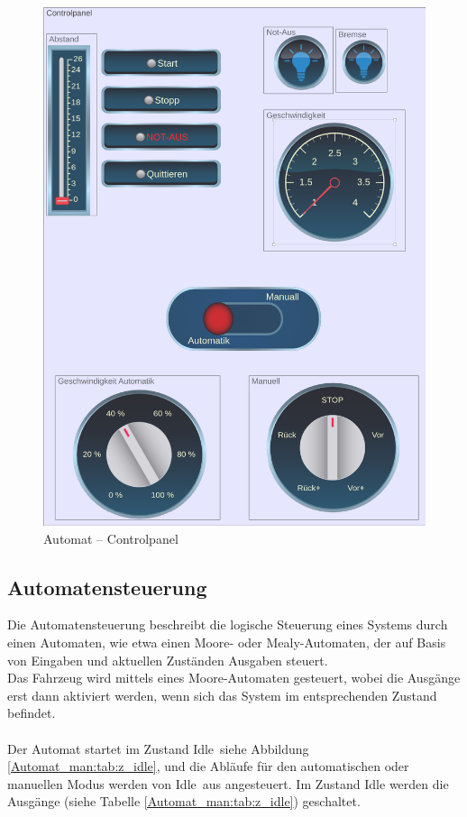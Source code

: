 \pagebreak[1]
\begin{figure}[!ht]
	\begin{center}
		\includegraphics[width=\textwidth]{img/5_simulation/Automat_con.png}
		\caption{Automat – Controlpanel}
		\label{Controlpanel:img:Controlpanel}
	\end{center}
\end{figure}
\pagebreak[4]


\subsection{Automatensteuerung}
\label{Automatensteuerung}
Die Automatensteuerung beschreibt die logische Steuerung eines Systems durch einen Automaten, wie etwa einen Moore- oder Mealy-Automaten, der auf Basis von Eingaben und aktuellen Zuständen Ausgaben steuert.\\
Das Fahrzeug wird mittels eines Moore-Automaten gesteuert, wobei die Ausgänge erst dann aktiviert werden, wenn sich das System im entsprechenden Zustand befindet.\\ \ \\
Der Automat startet im Zustand \frqq Idle\flqq\ siehe Abbildung \ref{Automat_man:tab:z_idle}, und die Abläufe für den automatischen oder manuellen Modus werden von \frqq Idle\flqq\ aus angesteuert. Im Zustand Idle werden die Ausgänge (siehe Tabelle \ref{Automat_man:tab:z_idle}) geschaltet.\\

